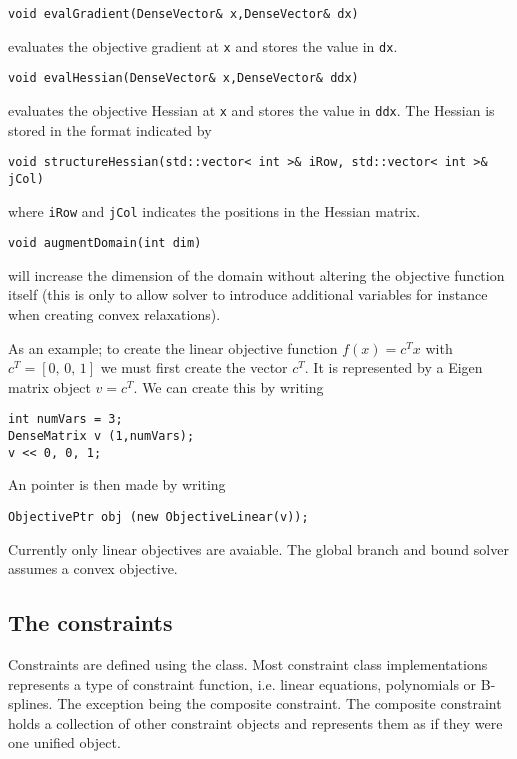 \begin{lstlisting}
void evalGradient(DenseVector& x,DenseVector& dx)
\end{lstlisting}
evaluates the objective gradient at \texttt{x} and stores the value in \texttt{dx}.

\begin{lstlisting}
void evalHessian(DenseVector& x,DenseVector& ddx)
\end{lstlisting}
evaluates the objective Hessian at \texttt{x} and stores the value in \texttt{ddx}. The Hessian is stored in the format indicated by 
\begin{lstlisting}
void structureHessian(std::vector< int >& iRow, std::vector< int >& jCol)
\end{lstlisting}
where \texttt{iRow} and \texttt{jCol} indicates the positions in the Hessian matrix.

\begin{lstlisting}
void augmentDomain(int dim)
\end{lstlisting}
will increase the dimension of the domain without altering the objective function itself (this is only to allow solver to introduce additional variables for instance when creating convex relaxations).


As an example; to create the linear objective function $f(x) = c^{T}x$ with $c^{T} = \left[ 0,\,0,\,1 \right]$ we must first create the vector $c^{T}$. It is represented by a Eigen matrix object $v = c^{T}$.  We can create this  by writing
\begin{lstlisting}
int numVars = 3;
DenseMatrix v (1,numVars);
v << 0, 0, 1;
\end{lstlisting}
An  pointer is then made by writing
\begin{lstlisting}
ObjectivePtr obj (new ObjectiveLinear(v));
\end{lstlisting}

Currently only linear objectives are avaiable. The global branch and bound solver assumes a convex objective. 


\subsection{The constraints}

Constraints are defined using the  class. Most constraint class implementations represents a type of constraint function, i.e. linear equations, polynomials or B-splines. The exception being the composite constraint. The composite constraint holds a collection of other constraint objects and represents them as if they were one unified object.

